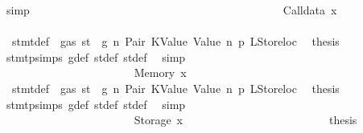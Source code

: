 \begin{isabellebody}
\ simp\isanewline
\ \ \ \ \ \ \ \ \ \ \ \ \ \ \ \ \ \ \ \ \isamarkupfalse%
\isanewline
\ \ \ \ \ \ \ \ \ \ \ \ \ \ \ \ \ \ \ \ \ \ \isamarkupfalse%
\ {\isacharparenleft}{\kern0pt}Calldata\ x{}{\isacharparenright}{\kern0pt}\isanewline
\ \ \ \ \ \ \ \ \ \ \ \ \ \ \ \ \ \ \ \ \ \ \isamarkupfalse%
\ {}{\isacharparenleft}{\kern0pt}{}{\isacharparenright}{\kern0pt}\ stmt{\isacharunderscore}{\kern0pt}def\ {\isacharbackquoteopen}{\isasymnot}\ gas\ st\ {\isasymle}\ g{\isacharbackquoteclose}\ n\ Pair\ KValue\ Value\ n{}\ p{}\ LStoreloc\ \isamarkupfalse%
\ {\isacharquery}{\kern0pt}thesis\ \isamarkupfalse%
\ stmt{\isachardot}{\kern0pt}psimps{\isacharparenleft}{\kern0pt}{}{\isacharparenright}{\kern0pt}\ g{\isacharunderscore}{\kern0pt}def\ st{\isacharprime}{\kern0pt}{\isacharunderscore}{\kern0pt}def\ st{\isacharprime}{\kern0pt}{\isacharprime}{\kern0pt}{\isacharunderscore}{\kern0pt}def\ \isamarkupfalse%
\ simp\isanewline
\ \ \ \ \ \ \ \ \ \ \ \ \ \ \ \ \ \ \ \ \isamarkupfalse%
\isanewline
\ \ \ \ \ \ \ \ \ \ \ \ \ \ \ \ \ \ \ \ \ \ \isamarkupfalse%
\ {\isacharparenleft}{\kern0pt}Memory\ x{}{\isacharparenright}{\kern0pt}\isanewline
\ \ \ \ \ \ \ \ \ \ \ \ \ \ \ \ \ \ \ \ \ \ \isamarkupfalse%
\ {}{\isacharparenleft}{\kern0pt}{}{\isacharparenright}{\kern0pt}\ stmt{\isacharunderscore}{\kern0pt}def\ {\isacharbackquoteopen}{\isasymnot}\ gas\ st\ {\isasymle}\ g{\isacharbackquoteclose}\ n\ Pair\ KValue\ Value\ n{}\ p{}\ LStoreloc\ \isamarkupfalse%
\ {\isacharquery}{\kern0pt}thesis\ \isamarkupfalse%
\ stmt{\isachardot}{\kern0pt}psimps{\isacharparenleft}{\kern0pt}{}{\isacharparenright}{\kern0pt}\ g{\isacharunderscore}{\kern0pt}def\ st{\isacharprime}{\kern0pt}{\isacharunderscore}{\kern0pt}def\ st{\isacharprime}{\kern0pt}{\isacharprime}{\kern0pt}{\isacharunderscore}{\kern0pt}def\ \isamarkupfalse%
\ simp\isanewline
\ \ \ \ \ \ \ \ \ \ \ \ \ \ \ \ \ \ \ \ \isamarkupfalse%
\isanewline
\ \ \ \ \ \ \ \ \ \ \ \ \ \ \ \ \ \ \ \ \ \ \isamarkupfalse%
\ {\isacharparenleft}{\kern0pt}Storage\ x{}{\isacharparenright}{\kern0pt}\isanewline
\ \ \ \ \ \ \ \ \ \ \ \ \ \ \ \ \ \ \ \ \ \ \isamarkupfalse%
\ \isamarkupfalse%
\ {\isacharquery}{\kern0pt}thesis\isanewline
\ \ \ \ \ \ \ \ \ \ \ \ \ \ \ \ \ \ \ \ \ \ \isamarkupfalse%

\end{isabellebody}
